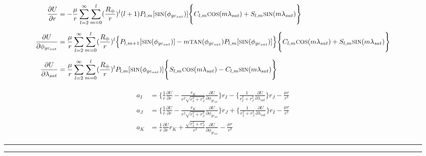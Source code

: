 \begin{gather}
    \begin{split}
        \frac{\partial U}{\partial r} &= -\frac{\mu}{r}\sum_{l=2}^{\infty}\sum_{m=0}^{l}(\frac{R_{\oplus}}{r})^l(l+1)P_{l,m}[\text{\footnotesize{SIN}}(\phi_{gc_{sat}})]\Biggl\{C_{l,m}\text{\footnotesize{COS}}(m\lambda_{sat})+S_{l,m}\text{\footnotesize{SIN}}(m\lambda_{sat})\Biggr\}\\[0.2cm]
        \frac{\partial U}{\partial\phi_{gc_{sat}}} &= \frac{\mu}{r}\sum_{l=2}^{\infty}\sum_{m=0}^{l}(\frac{R_\oplus}{r})^l\Big\{P_{l,m+1}[\text{\footnotesize{SIN}}(\phi_{gc_{sat}})]-m\text{\footnotesize{TAN}}(\phi_{gc_{sat}})P_{l,m}[\text{\footnotesize{SIN}}(\phi_{gc_{sat}})]\Big\}\Biggl\{C_{l,m}\text{\footnotesize{COS}}(m\lambda_{sat})+S_{l,m}\text{\footnotesize{SIN}}(m\lambda_{sat})\Biggr\}\\[0.2cm]
        \frac{\partial U}{\partial\lambda_{sat}} &= \frac{\mu}{r}\sum_{l=2}^{\infty}\sum_{m=0}^{l}(\frac{R_\oplus}{r})^lP_{l,m}[\text{\footnotesize{SIN}}(\phi_{gc_{sat}})]\Bigg\{S_{l,m}\text{\footnotesize{COS}}(m\lambda_{sat})-C_{l,m}\text{\footnotesize{SIN}}(m\lambda_{sat})\Bigg\}
    \end{split}
\end{gather}
\center{\Big\Downarrow}

\begin{gather}
    \begin{split}
        a_I &= \Bigg\{\frac{1}{r}\frac{\partial U}{\partial r}-\frac{r_K}{r^2\sqrt{r_I^2+r_J^2}}\frac{\partial U}{\partial\phi_{gc_{sat}}}\Bigg\}r_I - \Bigg\{\frac{1}{r_I^2+r_J^2}\frac{\partial U}{\partial\lambda_{sat}}\Bigg\}r_J - \frac{\mu r}{r^3}\\[0.2cm]
        a_J &= \Bigg\{\frac{1}{r}\frac{\partial U}{\partial r}-\frac{r_K}{r^2\sqrt{r_I^2+r_J^2}}\frac{\partial U}{\partial\phi_{gc_{sat}}}\Bigg\}r_J + \Bigg\{\frac{1}{r_I^2+r_J^2}\frac{\partial U}{\partial\lambda_{sat}}\Bigg\}r_I - \frac{\mu r}{r^3}\\[0.2cm]
        a_K &= \frac{1}{r}\frac{\partial U}{\partial r}r_K  + \frac{\sqrt{r_I^2+r_J^2}}{r^2}\frac{\partial U}{\partial\phi_{gc_{sat}}}- \frac{\mu r}{r^3}
    \end{split}
\end{gather}
\vspace{0.2cm}
\hrule
\vspace{0.1cm}
\hrule